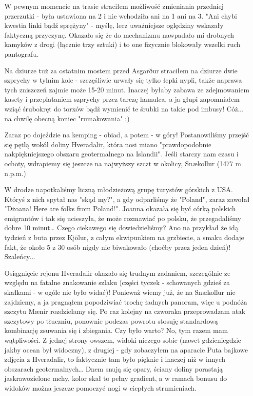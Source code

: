 W pewnym momencie na trasie straciłem możliwość zmieniania przedniej przerzutki - była ustawiona na 2 i nie wchodziła ani na 1 ani na 3. "Ani chybi kwestia linki bądź sprężyny" - myślę, lecz uważniejsze oględziny wskazały faktyczną przyczynę. Okazało się że do mechanizmu nawpadało mi drobnych kamyków z drogi (łącznie trzy sztuki) i to one fizycznie blokowały wszelki ruch pantografu.

Na dziurze tuż za ostatnim mostem przed Asgarður straciłem na dziurze dwie szprychy w tylnim kole - szczęśliwie urwały się tylko łepki nypli, także naprawa tych zniszczeń zajmie może 15-20 minut. Inaczej byłaby zabawa ze zdejmowaniem kasety i przeplataniem szprychy przez tarczę hamulca, a ja głupi zapomniałem wziąć śrubokręt do torxów bądź wymienić te śrubki na takie pod imbusy! Cóż... na chwilę obecną koniec "rumakowania" :)


Zaraz po dojeździe na kemping - obiad, a potem - w góry! Postanowiliśmy przejść się pętlą wokół doliny Hveradalir, która nosi miano "prawdopodobnie nakpiękniejszego obszaru geotermalnego na Islandii". Jeśli starczy nam czasu i ochoty, wdrapiemy się jeszcze na najwyższy szczt w okolicy, Snækollur (1477 m n.p.m.)

W drodze napotkaliśmy liczną młodzieżową grupę turystów górskich z USA. Któryś z nich spytał nas "skąd my?", a gdy odparliśmy że "Poland", zaraz zawołał "Dżoana! Here are folks from Poland!". Joanna okazała się być córką polskich emigrantów i tak się ucieszyła, że może rozmawiać po polsku, że przegadaliśmy dobre 10 minut… Czego ciekawego się dowiedzieliśmy? Ano na przykład że idą tydzień z buta przez Kjölur, z całym ekwipunkiem na grzbiecie, a smaku dodaje fakt, że około 5 z 30 osób nigdy nie biwakowało (choćby przez jeden dzień)! Szaleńcy...


Osiągnięcie rejonu Hveradalir okazało się trudnym zadaniem, szczególnie ze względu na fatalne znakowanie szlaku (części tyczek - schowanych gdzieś za skałkami - w ogóle nie było widać)! Ponieważ wiemy już, że na Snækollur nie zajdziemy, a ja pragnąłem popodziwiać trochę ładnych panoram, więc u podnóża szczytu Mænir rozdzielamy się. Po raz kolejny na czworaka przeprowadzam atak szczytowy po tłuczniu, ponownie podczas powrotu stosuję standardową kombinację zsuwania się i zbiegania. Czy było warto? No, tym razem mam wątpliwości. Z jednej strony owszem, widoki niczego sobie (nawet gdzieniegdzie jakby ocean był widoczny), z drugiej - gdy zobaczyłem na aparacie Puta bajkowe zdjęcia z Hveradalir, to faktycznie tam było pięknie i inaczej niż w innych obszarach geotermalnych… Dnem snują się opary, ściany doliny porastają jaskrawozielone mchy, kolor skał to pełny gradient, a w ramach bonusu do widoków można jeszcze pomoczyć nogi w ciepłych strumieniach.

